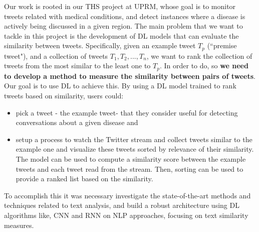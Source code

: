 \documentclass[12pt]{report}
\begin{document}
	Our work is rooted in our \ac{THS} project at UPRM, whose goal is to monitor tweets related with medical conditions, and detect instances where
a disease is actively being discussed in a given region.
The main problem that we want to tackle in this project is the development of  \ac{DL} models that can evaluate the similarity between
tweets. Specifically, given an example tweet $T_p$ (``premise tweet"), and  a collection of tweets $T_1, T_2, ..., T_n$, we want to rank the collection of tweets
from the most similar to the least one to $T_p$. In order to do, so {\bf we need to develop a method to measure the similarity between pairs of 
	tweets}. Our goal is to use \ac{DL} to achieve this. 
By using a \ac{DL} model trained to rank tweets based on similarity, users could: 
\begin{itemize}
	\item pick a tweet - the example tweet- that they consider useful for detecting conversations about a given disease and
	\item setup a process to watch the Twitter stream and collect tweets similar  to the example one and visualize these tweets  sorted by 
	relevance of their similarity. The model can be used to compute a similarity score between the example tweets and each tweet read from the stream. Then, sorting can be used to provide a ranked list based on the similarity.
\end{itemize} 

To accomplish this it was necessary investigate the state-of-the-art methods and techniques related to text analysis, and build a robust architecture using \ac{DL} algorithms like, \ac{CNN} and \ac{RNN} on \ac{NLP} approaches,  focusing on text similarity measures.
\end{document}

